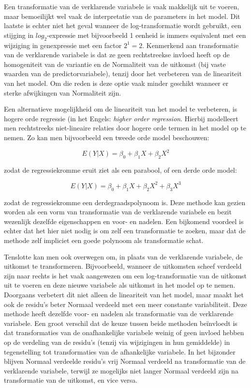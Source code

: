 \documentclass[
  12pt,dutch,coursenotes]{book}
\theoremstyle{definition}
\theoremstyle{definition}
\theoremstyle{definition}
\theoremstyle{definition}
\theoremstyle{remark}
\begin{document}
Een transformatie van de verklarende variabele is vaak makkelijk uit te voeren, maar bemoeilijkt wel vaak de interpretatie van de parameters in het model. Dit laatste is echter niet het geval wanneer de log-transformatie wordt gebruikt, een stijging in \(log_2\)-expressie met bijvoorbeeld 1 eenheid is immers equivalent met een wijziging in genexpressie met een factor \(2^1=2\). Kenmerkend aan transformatie van de verklarende variabele is dat ze geen rechtstreekse invloed heeft op de homogeniteit van de variantie en de Normaliteit van de uitkomst (bij vaste waarden van de predictorvariabele), tenzij door het verbeteren van de lineariteit van het model. Om die reden is deze optie vaak minder geschikt wanneer er sterke afwijkingen van Normaliteit zijn.

Een alternatieve mogelijkheid om de lineariteit van het model te verbeteren, is hogere orde regressie (in het Engels:
\emph{higher order regression}. Hierbij modelleert men rechtstreeks niet-lineaire relaties door hogere orde termen in het model op te nemen. Zo kan men bijvoorbeeld een tweede orde model beschouwen:

\[E(Y|X)=\beta_0+\beta_1X+\beta_2X^2\]

zodat de regressiekromme eruit ziet als een parabool, of een derde
orde model:

\[E(Y|X)=\beta_0+\beta_1X+\beta_2X^2+\beta_3X^3\]

zodat de regressiekromme een derdegraadspolynoom is. Deze methode kan gezien worden als een vorm van transformatie van de verklarende
variabele en bezit wezenlijk dezelfde eigenschappen en voor- en nadelen. Een bijkomend voordeel is echter dat het hier niet nodig is om zelf een transformatie te zoeken, maar dat de methode zelf impliciet een goede
polynoom als transformatie schat.

Tenslotte kan men ook overwegen om, in plaats van de verklarende variabele, de uitkomst te transformeren. Bijvoorbeeld, wanneer de uitkomsten scheef verdeeld zijn naar rechts is het vaak aangewezen om een log-transformatie van de uitkomst uit te voeren en deze nieuwe variabele als uitkomst in het model op te nemen. Doorgaans verbetert dit niet alleen de lineariteit van het model, maar maakt het ook de residu's beter Normaal verdeeld met een meer constante variabiliteit. Deze methode heeft dezelfde voor- en nadelen als transformatie van de verklarende variabele. Een groot verschil dat de keuze tussen beide methoden beïnvloedt is dat transformaties van de onafhankelijke variabele weinig of geen invloed hebben op de verdeling van de residu's (tenzij via wijzigingen in hun gemiddelde)
in tegenstelling tot transformaties van de afhankelijke variabele. In het bijzonder blijven Normaal verdeelde residu's vrij Normaal verdeeld na transformatie van de verklarende variabele, terwijl ze mogelijks niet langer Normaal verdeeld zijn na transformatie van de uitkomst, en vice versa.
\end{document}
